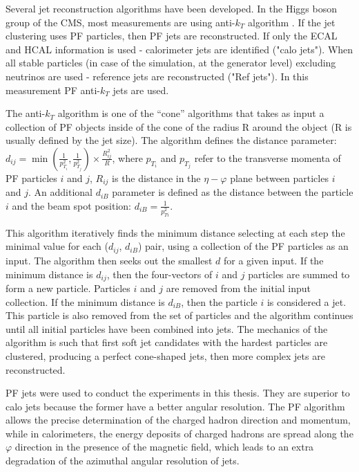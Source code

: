 Several jet reconstruction algorithms have been developed. In the Higgs boson group of the CMS, most measurements are using anti-$k_T$ algorithm \cite{antiKt}. If the jet clustering uses PF particles, then PF jets are reconstructed. If only the ECAL and HCAL information is used - calorimeter jets are identified ("calo jets"). When all stable particles (in case of the simulation, at the generator level) excluding neutrinos are used - reference jets are reconstructed ("Ref jets"). In this measurement PF anti-$k_T$ jets are used. 

The anti-$k_T$ algorithm is one of the ``cone'' algorithms that takes as input a collection of PF objects inside of the cone of the radius R around the object (R is usually defined by the jet size). The algorithm defines the distance parameter:
$d_{ij} = \min (\frac{1}{p^2_{T_i}}, \frac{1}{p^2_{T_j}}) \times \frac{R^2_{ij}}{R}$, where $p_{T_i}$ and $p_{T_j}$ refer to the transverse momenta of PF particles $i$ and $j$, $R_{ij}$ is the distance in the $\eta - \varphi$ plane between particles $i$ and $j$. An additional $d_{iB}$ parameter is defined as the distance between the particle $i$ and the beam spot position: $d_{iB} = \frac{1}{p^2_{Ti} }$.

This algorithm iteratively finds the minimum distance selecting at each step the minimal value for each ($d_{ij}$, $d_{iB}$) pair, using a collection of the PF particles as an input. The algorithm then seeks out the smallest $d$ for a given input. If the minimum distance is $d_{ij}$, then the four-vectors of $i$ and $j$ particles are summed to form a new particle. Particles $i$ and $j$ are removed from the initial input collection. If the minimum distance is $d_{iB}$, then the particle $i$ is considered a jet. This particle is also removed from the set of particles and the algorithm continues until all initial particles have been combined into jets. The mechanics of the algorithm is such that first soft jet candidates with the hardest particles are clustered, producing a perfect cone-shaped jets, then more complex jets are reconstructed.

PF jets were used to conduct the experiments in this thesis. They are superior to calo jets because the former have a better angular resolution. The PF algorithm allows the precise determination of the charged hadron direction and momentum, while in calorimeters, the energy deposits of charged hadrons are spread along the $\varphi$ direction in the presence of the magnetic field, which leads to an extra degradation of the azimuthal angular resolution of jets.

